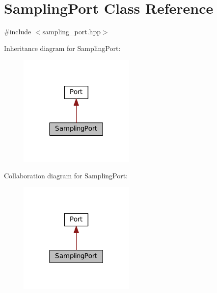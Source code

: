 \hypertarget{classSamplingPort}{}\section{Sampling\+Port Class Reference}
\label{classSamplingPort}


{\ttfamily \#include $<$sampling\+\_\+port.\+hpp$>$}



Inheritance diagram for Sampling\+Port\+:
\nopagebreak
\begin{figure}[H]
\begin{center}
\leavevmode
\includegraphics[width=161pt]{classSamplingPort__inherit__graph}
\end{center}
\end{figure}


Collaboration diagram for Sampling\+Port\+:
\nopagebreak
\begin{figure}[H]
\begin{center}
\leavevmode
\includegraphics[width=161pt]{classSamplingPort__coll__graph}
\end{center}
\end{figure}
